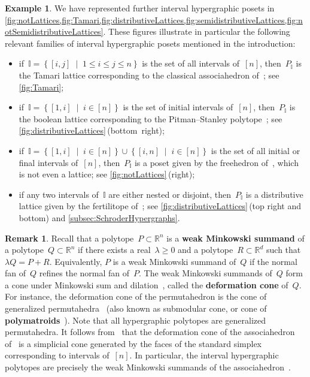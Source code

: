 \documentclass{amsart}
\theoremstyle{definition}
\newtheorem{example}[theorem]{Example}
\newtheorem{remark}[theorem]{Remark}
\newcommand{\R}{\mathbb{R}} %
\newcommand{\set}[2]{\left\{ #1 \;\middle|\; #2 \right\}} %
\newcommand{\defn}[1]{\textbf{\textsf{\color{PineGreen} #1}}} %
\newcommand{\II}{\mathbb I} %
\begin{document}
\begin{example}
We have represented further interval hypergraphic posets in \cref{fig:notLattices,fig:Tamari,fig:distributiveLattices,fig:semidistributiveLattices,fig:notSemidistributiveLattices}.
These figures illustrate in particular the following relevant families of interval hypergraphic posets mentioned in the introduction:
\begin{itemize}
\item if~$\II = \set{[i,j]}{1 \le i \le j \le n}$ is the set of all intervals of~$[n]$, then~$P_\II$ is the Tamari lattice corresponding to the classical associahedron of~\cite{ShniderSternberg,Loday}; see \cref{fig:Tamari};
\item if~$\II = \set{[1,i]}{i \in [n]}$ is the set of initial intervals of~$[n]$, then~$P_\II$ is the boolean lattice corresponding to the Pitman--Stanley polytope~\cite{PitmanStanley}; see \cref{fig:distributiveLattices}\,(bottom~right);
\item if~$\II = \set{[1,i]}{i \in [n]} \cup \set{[i,n]}{i \in [n]}$ is the set of all initial or final intervals of~$[n]$, then~$P_\II$ is a poset given by the freehedron of~\cite{Saneblidze-freehedron}, which is not even a lattice; see \cref{fig:notLattices}\,(right);
\item if any two intervals of~$\II$ are either nested or disjoint, then~$P_\II$ is a distributive lattice given by the fertilitope of~\cite{Defant-fertilitopes}; see \cref{fig:distributiveLattices}\,(top right and bottom) and \cref{subsec:SchroderHypergraphs}.
\end{itemize}
\end{example}

\begin{remark}
Recall that a polytope~$P \subset \R^n$ is a \defn{weak Minkowski summand} of a polytope~${Q \subset \R^n}$ if there exists a real~$\lambda \ge 0$ and a polytope~$R \subset \R^d$ such that~$\lambda Q = P + R$.
Equivalently, $P$ is a weak Minkowski summand of~$Q$ if the normal fan of~$Q$ refines the normal fan of~$P$.
The weak Minkowski summands of~$Q$ form a cone under Minkowski sum and dilation~\cite{McMullen-typeCone}, called the \defn{deformation cone} of~$Q$.
For instance, the deformation cone of the permutahedron is the cone of generalized permutahedra~\cite{Postnikov, PostnikovReinerWilliams} (also known as submodular cone, or cone of \defn{polymatroids}~\cite{Edmonds}).
Note that all hypergraphic polytopes are generalized permutahedra.
It follows from~\cite{BazierMatteChapelierLaguetDouvilleMousavandThomasYildirim,PadrolPaluPilaudPlamondon} that the deformation cone of the associahedron of~\cite{ShniderSternberg,Loday} is a simplicial cone generated by the faces of the standard simplex corresponding to intervals of~$[n]$.
In particular, the interval hypergraphic polytopes are precisely the weak Minkowski summands of the associahedron~\cite{ShniderSternberg,Loday}.
\end{remark}
\end{document}
